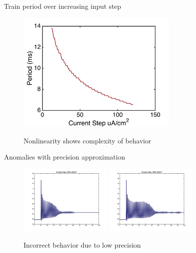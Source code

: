 \documentclass{beamer}
\begin{document}
\begin{frame}{Train period over increasing input step}
\begin{figure}
    \centering
    \includegraphics[width = 0.7\textwidth]{./images/periodvscurrent.jpg}

    Nonlinearity shows complexity of behavior
  \end{figure}

\end{frame}

\begin{frame}{Anomalies with precision approximation}
  \begin{figure}
    \centering
    \includegraphics[width = 0.4\textwidth]{./images/current55p5.jpg}
    \includegraphics[width = 0.4\textwidth]{./images/current55p6.jpg}

    Incorrect behavior due to low precision
  \end{figure}
\end{frame}
\end{document}
